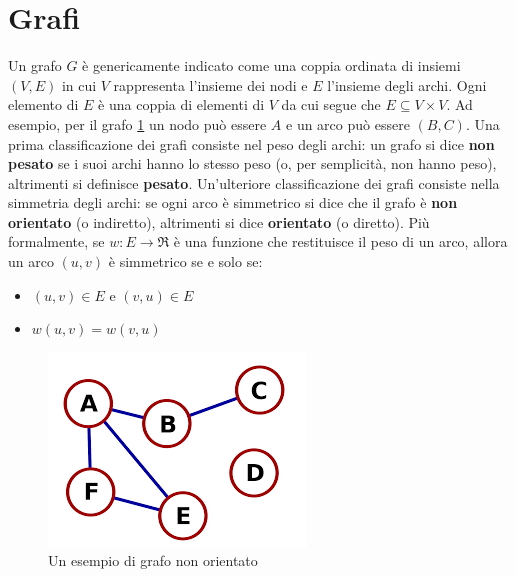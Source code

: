 \documentclass[12pt,a4paper]{book} %
\begin{document}
	\section{Grafi}
	Un grafo $G$ è genericamente indicato come una coppia ordinata di insiemi $(V,E)$ in cui $V$ rappresenta l'insieme dei nodi e $E$ l'insieme degli archi. Ogni elemento di $E$ è una coppia di elementi di $V$ da cui segue che $E \subseteq V \times V$. Ad esempio, per il grafo \ref{fig:grafo-esempio} un nodo può essere $A$ e un arco può essere $(B,C)$. Una prima classificazione dei grafi consiste nel peso degli archi: un grafo si dice \textbf{non pesato} se i suoi archi hanno lo stesso peso (o, per semplicità, non hanno peso), altrimenti si definisce \textbf{pesato}. Un'ulteriore classificazione dei grafi consiste nella simmetria degli archi: se ogni arco è simmetrico si dice che il grafo è \textbf{non orientato} (o indiretto), altrimenti si dice \textbf{orientato} (o diretto). Più formalmente, se $w:E \rightarrow \Re$ è una funzione che restituisce il peso di un arco, allora un arco $(u,v)$ è simmetrico se e solo se:
	\begin{itemize}
		\item $(u,v) \in E$ e $(v,u) \in E$
		\item $w(u,v) = w(v,u)$
	\end{itemize}

	\begin{figure}
		\centering
		\includegraphics[width=0.5\linewidth]{grafo-esempio}
		\caption{Un esempio di grafo non orientato}
		\label{fig:grafo-esempio}
	\end{figure}
\end{document}
